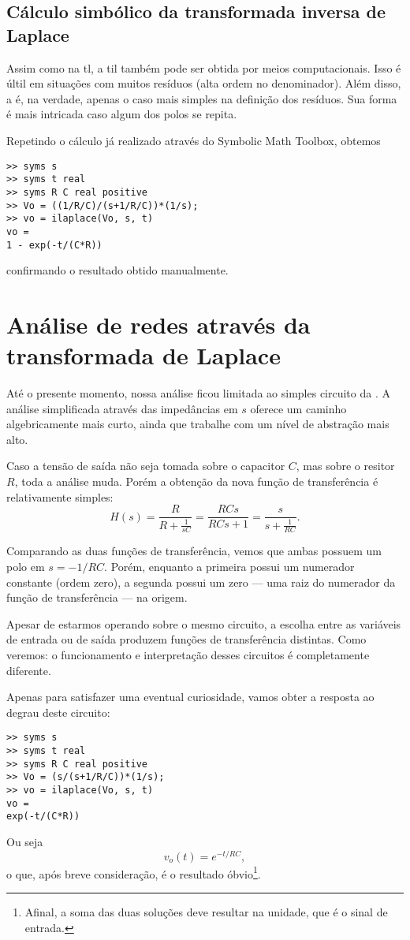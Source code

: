 \subsection{Cálculo simbólico da transformada inversa de Laplace}

Assim como na \ac{tl}, a \ac{til} também pode ser obtida por meios computacionais. Isso é últil em situações com muitos resíduos (alta ordem no denominador). Além disso, a  é, na verdade, apenas o caso mais simples na definição dos resíduos. Sua forma é mais intricada caso algum dos polos se repita.

Repetindo o cálculo já realizado através do Symbolic Math Toolbox, obtemos
\begin{lstlisting}
>> syms s
>> syms t real
>> syms R C real positive
>> Vo = ((1/R/C)/(s+1/R/C))*(1/s);
>> vo = ilaplace(Vo, s, t)
vo =
1 - exp(-t/(C*R))
\end{lstlisting}
confirmando o resultado obtido manualmente.

\section{Análise de redes através da transformada de Laplace}

Até o presente momento, nossa análise ficou limitada ao simples circuito da . A análise simplificada através das impedâncias em $s$ oferece um caminho algebricamente mais curto, ainda que trabalhe com um nível de abstração mais alto.

Caso a tensão de saída não seja tomada sobre o capacitor $C$, mas sobre o resitor $R$, toda a análise muda. Porém a obtenção da nova função de transferência é relativamente simples:
\begin{equation*}
	H(s)=\frac{R}{R+\frac{1}{sC}}=\frac{RCs}{RCs+1}=\frac{s}{s+\frac{1}{RC}}.
\end{equation*}

Comparando as duas funções de transferência, vemos que ambas possuem um polo em $s=-1\slash RC$. Porém, enquanto a primeira possui um numerador constante (ordem zero), a segunda possui um zero --- uma raiz do numerador da função de transferência --- na origem.

Apesar de estarmos operando sobre o mesmo circuito, a escolha entre as variáveis de entrada ou de saída produzem funções de transferência distintas. Como veremos: o funcionamento e interpretação desses circuitos é completamente diferente.

Apenas para satisfazer uma eventual curiosidade, vamos obter a resposta ao degrau deste circuito:
\begin{lstlisting}
>> syms s
>> syms t real
>> syms R C real positive
>> Vo = (s/(s+1/R/C))*(1/s);
>> vo = ilaplace(Vo, s, t)
vo =
exp(-t/(C*R))
\end{lstlisting}
Ou seja
\begin{equation*}
	v_o(t)=e^{-t/RC},
\end{equation*}
o que, após breve consideração, é o resultado óbvio\footnote{Afinal, a soma das duas soluções deve resultar na unidade, que é o sinal de entrada.}.


